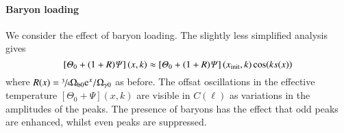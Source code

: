     
    
    
    




    
    \paragraph{Baryon loading}\label{test}
    We consider the effect of baryon loading. The slightly less simplified analysis gives
    \begin{equation}
        \left[\varTheta_0 +(1+R) \varPsi\right](x, k) \approx \left[\varTheta_0 + (1+R)\varPsi\right](x_\mathrm{init}, k)\cos(ks(x)) 
    \end{equation}
    where $R(x) = \sfrac{3}{4}\Omega\ped{b0} \eu[x]/\Omega\ped{\gamma 0}$ as before. The offsat oscillations in the effective temperature $\left[\Theta_0 +\Psi\right](x, k)$ are visible in $C(\ell)$ as variations in the amplitudes of the peaks. The presence of baryons has the effect that odd peaks are enhanced, whilst even peaks are suppressed. 

